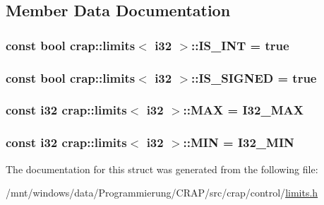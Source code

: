 \subsection{Member Data Documentation}
\hypertarget{structcrap_1_1limits_3_01i32_01_4_a6cf2bcdbf1ba35d760823cdb901c94a5}{
\subsubsection[{I\-S\-\_\-\-I\-N\-T}]{\setlength{\rightskip}{0pt plus 5cm}const bool {\bf crap\-::limits}$<$ {\bf i32} $>$\-::I\-S\-\_\-\-I\-N\-T = true\hspace{0.3cm}{\ttfamily [static]}}}\label{structcrap_1_1limits_3_01i32_01_4_a6cf2bcdbf1ba35d760823cdb901c94a5}
\hypertarget{structcrap_1_1limits_3_01i32_01_4_a39bc0425c1c42bf8589dd42be54c4a0a}{
\subsubsection[{I\-S\-\_\-\-S\-I\-G\-N\-E\-D}]{\setlength{\rightskip}{0pt plus 5cm}const bool {\bf crap\-::limits}$<$ {\bf i32} $>$\-::I\-S\-\_\-\-S\-I\-G\-N\-E\-D = true\hspace{0.3cm}{\ttfamily [static]}}}\label{structcrap_1_1limits_3_01i32_01_4_a39bc0425c1c42bf8589dd42be54c4a0a}
\hypertarget{structcrap_1_1limits_3_01i32_01_4_ab7bc98df30a82beffa2e85a1c53e5b86}{
\subsubsection[{M\-A\-X}]{\setlength{\rightskip}{0pt plus 5cm}const {\bf i32} {\bf crap\-::limits}$<$ {\bf i32} $>$\-::M\-A\-X = {\bf I32\-\_\-\-M\-A\-X}\hspace{0.3cm}{\ttfamily [static]}}}\label{structcrap_1_1limits_3_01i32_01_4_ab7bc98df30a82beffa2e85a1c53e5b86}
\hypertarget{structcrap_1_1limits_3_01i32_01_4_ab2a35d740c44e069a91e9b1a60442606}{
\subsubsection[{M\-I\-N}]{\setlength{\rightskip}{0pt plus 5cm}const {\bf i32} {\bf crap\-::limits}$<$ {\bf i32} $>$\-::M\-I\-N = {\bf I32\-\_\-\-M\-I\-N}\hspace{0.3cm}{\ttfamily [static]}}}\label{structcrap_1_1limits_3_01i32_01_4_ab2a35d740c44e069a91e9b1a60442606}


The documentation for this struct was generated from the following file\-:\begin{DoxyCompactItemize}
\item 
/mnt/windows/data/\-Programmierung/\-C\-R\-A\-P/src/crap/control/\hyperlink{limits_8h}{limits.\-h}\end{DoxyCompactItemize}
